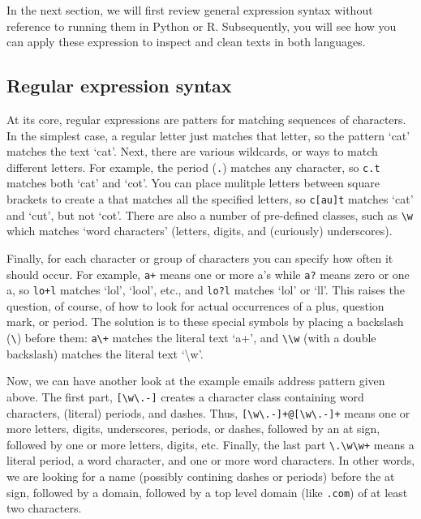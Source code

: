 In the next section, we will first review general expression syntax without reference to running them in Python or R.
Subsequently, you will see how you can apply these expression to inspect and clean texts in both languages.

\subsection{Regular expression syntax}

At its core, regular expressions are patters for matching sequences of characters.
In the simplest case, a regular letter just matches that letter, so the pattern `cat' matches the text `cat'.
Next, there are various wildcards, or ways to match different letters.
For example, the period (\verb|.|) matches any character, so \verb|c.t| matches both `cat' and `cot'.
You can place mulitple letters between square brackets to create a  that matches all the specified letters, so \verb|c[au]t| matches `cat' and `cut', but not `cot'.
There are also a number of pre-defined classes, such as \verb|\w| which matches `word characters' (letters, digits, and (curiously) underscores).

Finally, for each character or group of characters you can specify how often it should occur.
For example, \verb|a+| means one or more a's while \verb|a?| means zero or one a, so \verb|lo+l| matches `lol', `lool', etc.,
and \verb|lo?l| matches `lol' or `ll'.
This raises the question, of course, of how to look for actual occurrences of a plus, question mark, or period.
The solution is to  these special symbols by placing a backslash (\verb|\|) before them:
\verb|a\+| matches the literal text `a+', and \verb|\\w| (with a double backslash) matches the literal text `\textbackslash w'. 

Now, we can have another look at the example emails address pattern given above.
The first part, \verb|[\w\.-]| creates a character class containing word characters, (literal) periods, and dashes.
Thus, \verb|[\w\.-]+@[\w\.-]+| means one or more letters, digits, underscores, periods, or dashes, followed by an at sign,
followed by one or more letters, digits, etc.
Finally, the last part \verb|\.\w\w+| means a literal period, a word character, and one or more word characters.
In other words, we are looking for a name (possibly contining dashes or periods) before the at sign,
followed by a domain, followed by a top level domain (like \verb|.com|) of at least two characters.

